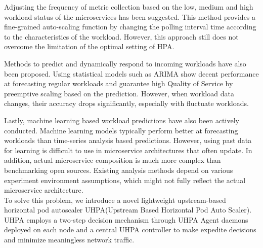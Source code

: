 \documentclass[conference]{IEEEtran}
\begin{document}
Adjusting the frequency of metric collection based on the low, medium and high workload status of the microservices has been suggested\cite{jiang2021fine}. This method provides a fine-grained auto-scaling function by changing the polling interval time according to the characteristics of the workload. However, this approach still does not overcome the limitation of the optimal setting of HPA.

Methods to predict and dynamically respond to incoming workloads have also been proposed. Using statistical models such as ARIMA show decent performance at forecasting regular workloads and  guarantee high Quality of Service by preemptive scaling based on the prediction\cite{dimolitsas2022ahp4hpa}\cite{zhao2019research}\cite{he2020novel}. However, when workload data changes, their accuracy drops significantly, especially with fluctuate workloads\cite{yunyun2022research}.

Lastly, machine learning based workload predictions have also been actively conducted\cite{dang2021deep}\cite{gan2021sage}. Machine learning models typically perform better at forecasting workloads than time-series analysis based predictions\cite{shim2023predictive}. However, using past data for learning is difficult to use in microservice architectures that often update. In addition, actual microservice composition is much more complex than benchmarking open sources. Existing analysis methods depend on various experiment environment assumptions, which might not fully reflect the actual microservice architecture\cite{huye2023lifting}. \\


To solve this problem, we introduce a novel lightweight upstream-based horizontal pod autoscaler UHPA(Upstream Based Horizontal Pod Auto Scaler). UHPA employs a two-step decision  mechanism through UHPA Agent daemons deployed on each node and a central UHPA controller to make expedite decisions and minimize meaningless network traffic.



\end{document}
